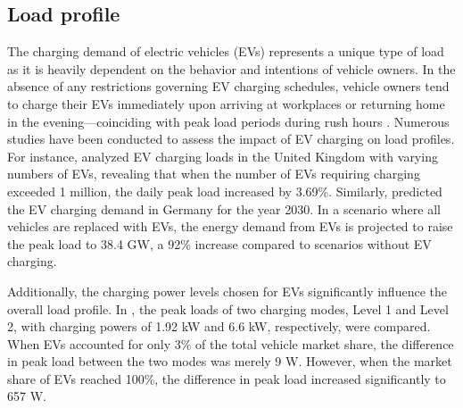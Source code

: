 \documentclass{thesis}
\begin{document}
\subsection{Load profile}
The charging demand of electric vehicles (EVs) represents a unique type of load as it is heavily dependent on the behavior and intentions of vehicle owners. In the absence of any restrictions governing EV charging schedules, vehicle owners tend to charge their EVs immediately upon arriving at workplaces or returning home in the evening—coinciding with peak load periods during rush hours \cite{57_greenin,58_greenin}. Numerous studies have been conducted to assess the impact of EV charging on load profiles. For instance, \cite{59_greenin} analyzed EV charging loads in the United Kingdom with varying numbers of EVs, revealing that when the number of EVs requiring charging exceeded 1 million, the daily peak load increased by 3.69\%. Similarly, \cite{60_greenin} predicted the EV charging demand in Germany for the year 2030. In a scenario where all vehicles are replaced with EVs, the energy demand from EVs is projected to raise the peak load to 38.4 GW, a 92\% increase compared to scenarios without EV charging.

Additionally, the charging power levels chosen for EVs significantly influence the overall load profile. In \cite{61_greenin}, the peak loads of two charging modes, Level 1 and Level 2, with charging powers of 1.92 kW and 6.6 kW, respectively, were compared. When EVs accounted for only 3\% of the total vehicle market share, the difference in peak load between the two modes was merely 9 W. However, when the market share of EVs reached 100\%, the difference in peak load increased significantly to 657 W. 
\end{document}
